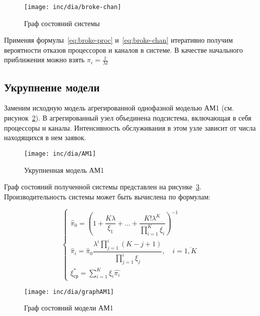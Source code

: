 \hfill

\begin{figure}[ht]
\centering
\texttt{[image: inc/dia/broke-chan]}
\caption{Граф состояний системы}
\label{fig:broke-chan}
\end{figure}

\hfill

Применяя формулы~\ref{eq:broke-proc} и~\ref{eq:broke-chan} итеративно получим вероятности отказов процессоров и каналов в системе. В качестве начального приближения можно взять $\pi_i=\frac{1}{M}$

\hfill

\subsection{Укрупнение модели}

\hfill

Заменим исходную модель агрегированной однофазной моделью АМ1 (см. рисунок~\ref{fig:AM1}). В агрегированный узел объединена подсистема, включающая в себя процессоры и каналы. Интенсивность обслуживания в этом узле зависит от числа находящихся в нем заявок.

\hfill

\begin{figure}[ht]
\centering
\texttt{[image: inc/dia/AM1]}
\caption{Укрупненная модель АМ1}
\label{fig:AM1}
\end{figure}

\hfill

Граф состояний полученной системы представлен на рисунке~\ref{fig:graphAM1}. Производительность системы может быть вычислена по формулам:


\begin{equation}
\label{eq:AM1}
\left\{
   \begin{array}{lcl}
	\hat{\pi}_{0} = \left( 1 + \dfrac{K \lambda}{\xi_1} +  ... + \dfrac{K! \lambda^{K}}{\prod \limits_{i=1}^K \xi_i} \right) ^{-1} \\
	\hat{\pi}_{i} = \hat{\pi}_{0} \dfrac{\lambda^{i}\prod \limits_{j=1}^{i} (K-j+1)}{\prod \limits_{j=1}^i \xi_{j}}, \quad i = \overline{1,K}  \\ 
	\xi_{ср}^{*}=\sum \limits_{i=1}^K \xi_i \hat{\pi_i}
   \end{array}
\right.
\end{equation}


\begin{figure}[ht]
\centering
\texttt{[image: inc/dia/graphAM1]}
\caption{Граф состояний модели АМ1}
\label{fig:graphAM1}
\end{figure}

